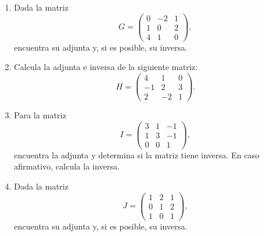 \documentclass[10pt,a4paper]{article}
\begin{document}
\begin{enumerate}[resume]
    \item Dada la matriz
    \[
    G = \begin{pmatrix}
    0 & -2 & 1 \\
    1 & 0 & 2 \\
    4 & 1 & 0
    \end{pmatrix},
    \]
    encuentra su adjunta y, si es posible, su inversa.
    
    \item Calcula la adjunta e inversa de la siguiente matriz:
    \[
    H = \begin{pmatrix}
    4 & 1 & 0 \\
    -1 & 2 & 3 \\
    2 & -2 & 1
    \end{pmatrix}.
    \]
    
    \item Para la matriz
    \[
    I = \begin{pmatrix}
    3 & 1 & -1 \\
    1 & 3 & -1 \\
    0 & 0 & 1
    \end{pmatrix},
    \]
    encuentra la adjunta y determina si la matriz tiene inversa. En caso afirmativo, calcula la inversa.
    
    \item Dada la matriz
    \[
    J = \begin{pmatrix}
    1 & 2 & 1 \\
    0 & 1 & 2 \\
    1 & 0 & 1
    \end{pmatrix},
    \]
    encuentra su adjunta y, si es posible, su inversa.
\end{enumerate}
\end{document}
